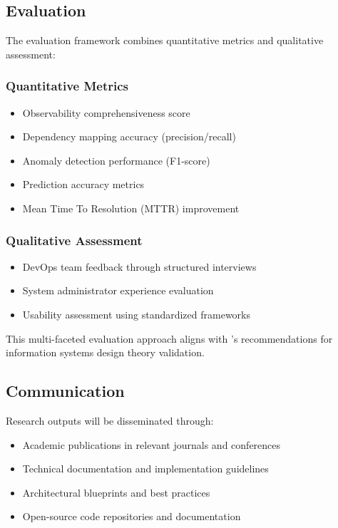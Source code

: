 \documentclass[10pt,journal,compsoc]{IEEEtran}
\begin{document}
\subsection{Evaluation}

The evaluation framework combines quantitative metrics and qualitative assessment:

\subsubsection{Quantitative Metrics}
\begin{itemize}
    \item Observability comprehensiveness score
    \item Dependency mapping accuracy (precision/recall)
    \item Anomaly detection performance (F1-score)
    \item Prediction accuracy metrics
    \item Mean Time To Resolution (MTTR) improvement
\end{itemize}

\subsubsection{Qualitative Assessment}
\begin{itemize}
    \item DevOps team feedback through structured interviews
    \item System administrator experience evaluation
    \item Usability assessment using standardized frameworks
\end{itemize}

This multi-faceted evaluation approach aligns with \cite{walls1992building}'s recommendations for information systems design theory validation.

\subsection{Communication}

Research outputs will be disseminated through:

\begin{itemize}
    \item Academic publications in relevant journals and conferences
    \item Technical documentation and implementation guidelines
    \item Architectural blueprints and best practices
    \item Open-source code repositories and documentation
\end{itemize}
\end{document}
